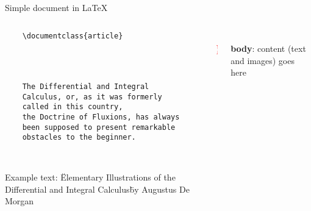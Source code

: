 

\begin{frame}[fragile, t]{Simple document in \LaTeX}
	\begin{columns}
        \begin{column}{0.5\textwidth}
	\begin{verbatim} 
	\documentclass{article}

		
	

	The Differential and Integral 
	Calculus, or, as it was formerly 
	called in this country, 
	the Doctrine of Fluxions, has always 
	been supposed to present remarkable 
	obstacles to the beginner.

	
	\end{verbatim}

	Example text: \"Elementary Illustrations of the Differential and Integral Calculus\" by Augustus De Morgan
\end{column}
\begin{column}{0.05\textwidth}
	\phantom{{\Huge \textcolor{red}{ \} } }}
	\\[2cm]
	{\Huge \textcolor{red}{ \} } }
	
\end{column}
\begin{column}{0.4\textwidth}
	\\[2cm]
	\textbf{body}: content (text and images) goes here
\end{column}
\end{columns}

\end{frame}
